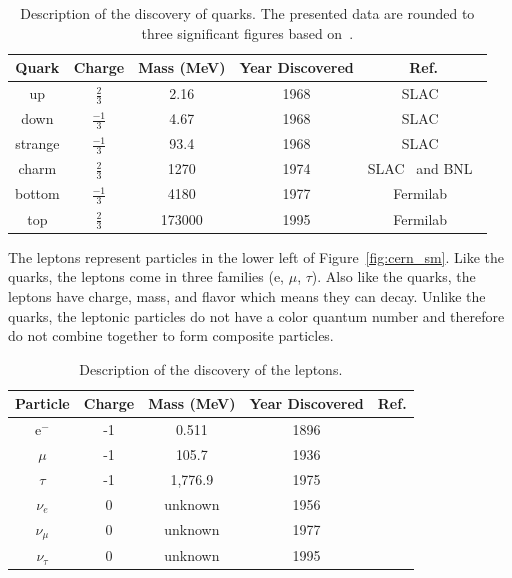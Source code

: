 \begin{table}
\begin{center}
\begin{tabular}{||c c c c c||}
 \hline
 Quark & Charge & Mass (MeV) & Year Discovered & Ref.\\ [0.5ex]
 \hline\hline
 up & $\frac{2}{3}$ & 2.16 & 1968 & SLAC~\citep{1969PhRvL..23..930B, 1969PhRvL..23..935B} \\
 \hline
 down & $\frac{-1}{3}$ & 4.67 & 1968 & SLAC~\citep{1969PhRvL..23..930B, 1969PhRvL..23..935B} \\
 \hline
 strange & $\frac{-1}{3}$ & 93.4 & 1968 & SLAC~\citep{1969PhRvL..23..930B, 1969PhRvL..23..935B} \\
 \hline
 charm & $\frac{2}{3}$ & 1270 & 1974 & SLAC~\citep{augustin1974observation} and BNL~\citep{Jpsi_PhysRevLett.33.1404} \\
 \hline
 bottom & $\frac{-1}{3}$ & 4180 & 1977 & Fermilab~\citep{bottom_PhysRevLett.39.252}\\
 \hline
 top & $\frac{2}{3}$ & 173000 & 1995 & Fermilab~\citep{topquark_Abachi_1995} \\
 \hline
\end{tabular}
\caption{Description of the discovery of quarks.
  The presented data are rounded to three significant figures based on~\citep{Workman:2022ynf}.}
\label{table:quark}
\end{center}
\end{table}

The leptons represent particles in the lower left of Figure~\ref{fig:cern_sm}.
Like the quarks, the leptons come in three families (e, $\mu$, $\tau$).
Also like the quarks, the leptons have charge, mass, and flavor which means they can decay.
Unlike the quarks, the leptonic particles do not have a color quantum number and therefore do not combine together to form composite particles.

\begin{table}
\begin{center}
\begin{tabular}{||c c c c c||}
 \hline
 Particle & Charge & Mass (MeV) & Year Discovered & Ref.\\ [0.5ex]
 \hline\hline
 e$^{-}$ & -1 & 0.511 & 1896 & \citep{doi:10.1080/14786449708621070} \\
 \hline
 $\mu$ & -1 & 105.7 & 1936 & \citep{muon_discovery_PhysRev.51.884} \\
 \hline
 $\tau$ & -1 & 1,776.9 & 1975 & \citep{tau_discovery_PhysRevLett.35.1489} \\
 \hline
 $\nu_{e}$ & 0 & unknown & 1956 & \citep{first_neutrino_measurement} \\
 \hline
 $\nu_{\mu}$ & 0 & unknown & 1977 & \citep{PhysRevLett.9.36} \\
 \hline
 $\nu_{\tau}$ & 0 & unknown & 1995 & \citep{tau_neutrino_discovery_KODAMA2001218} \\
 \hline
\end{tabular}
\caption{Description of the discovery of the leptons.
}
\label{table:lepton}
\end{center}
\end{table}

